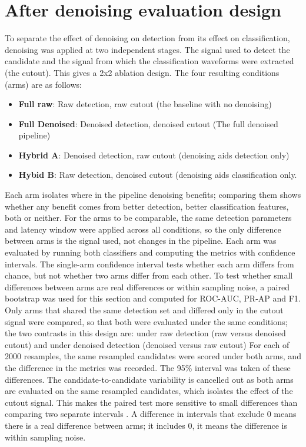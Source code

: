 \documentclass[ %
                    author={Daniel Page},
                supervisor={Dr. Andrew Calway},
                    degree={MSc},
                     title={Some Structural Guidelines for Data Science MSc Theses, Including Those With Long Titles that Run Across Multiple Lines on the Front Page},
                  subtitle={And those including an optional subtitle too, for good measure},
                      type={},
                      year={2021}]{dissertation}
\begin{document}
\section{After denoising evaluation design}
To separate the effect of denoising on detection from its effect on classification, denoising was applied at two independent stages. The signal used to detect the candidate and the signal from which the classification waveforms were extracted (the cutout). This gives a 2x2 ablation design. The four resulting conditions (arms) are as follows:
\begin{itemize}
    \item \textbf{Full raw}: Raw detection, raw cutout (the baseline with no denoising)
    \item \textbf{Full Denoised}: Denoised detection, denoised cutout (The full denoised pipeline)
    \item \textbf{Hybrid A}: Denoised detection, raw cutout (denoising aids detection only)
    \item \textbf{Hybid B}: Raw detection, denoised cutout (denoising aids classification only.     
\end{itemize}
Each arm isolates where in the pipeline denoising benefits; comparing them shows whether any benefit comes from better detection, better classification features, both or neither. 
For the arms to be comparable, the same detection parameters and latency window were applied across all conditions, so the only difference between arms is the signal used, not changes in the pipeline. Each arm was evaluated by running both classifiers and computing the metrics with confidence intervals. 
The single-arm confidence interval tests whether each arm differs from chance, but not whether two arms differ from each other. To test whether small differences between arms are real differences or within sampling noise, a paired bootstrap was used for this section and computed for ROC-AUC, PR-AP and F1. Only arms that shared the same detection set and differed only in the cutout signal were compared, so that both were evaluated under the same conditions; the two contrasts in this design are: under raw detection (raw versus denoised cutout) and under denoised detection (denoised versus raw cutout) 
For each of 2000 resamples, the same resampled candidates were scored under both arms, and the difference in the metrics was recorded. The 95\% interval was taken of these differences. The candidate-to-candidate variability is cancelled out as both arms are evaluated on the same resampled candidates, which isolates the effect of the cutout signal. This makes the paired test more sensitive to small differences than comparing two separate intervals \cite{du_when_2025}.
A difference in intervals that exclude 0 means there is a real difference between arms; it includes 0, it means the difference is within sampling noise. 
\end{document}
